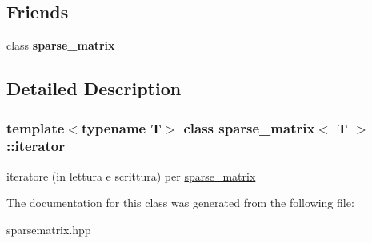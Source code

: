 \subsection*{Friends}
\begin{DoxyCompactItemize}
\item 
\mbox{\label{classsparse__matrix_1_1iterator_a7a67d422eb4e9951bb0c66020d5205d3}} 
class {\bfseries sparse\+\_\+matrix}
\end{DoxyCompactItemize}


\subsection{Detailed Description}
\subsubsection*{template$<$typename T$>$\newline
class sparse\+\_\+matrix$<$ T $>$\+::iterator}

iteratore (in lettura e scrittura) per \hyperlink{classsparse__matrix}{sparse\+\_\+matrix} 

The documentation for this class was generated from the following file\+:\begin{DoxyCompactItemize}
\item 
sparsematrix.\+hpp\end{DoxyCompactItemize}
